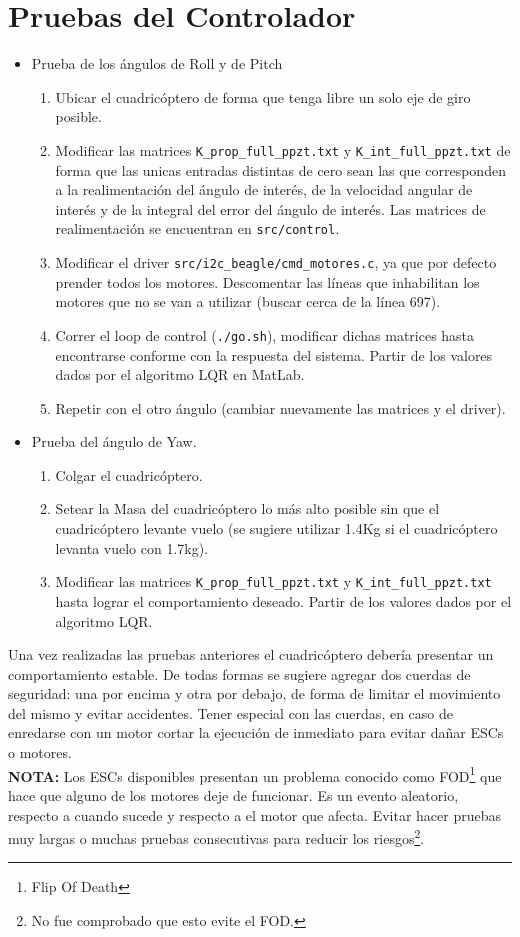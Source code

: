 \documentclass[main]{subfiles}
\begin{document}
\section{Pruebas del Controlador}
\begin{itemize}
\item Prueba de los \'angulos de Roll y de Pitch
	\begin{enumerate}
	\item Ubicar el cuadric\'optero de forma que tenga libre un solo eje de giro posible.
        \item Modificar las matrices \verb+K_prop_full_ppzt.txt+ y \verb+K_int_full_ppzt.txt+ de forma que las unicas entradas distintas de cero sean las que corresponden a la realimentaci\'on del \'angulo de inter\'es, de la velocidad angular de inter\'es y de la integral del error del \'angulo de inter\'es. Las matrices de realimentaci\'on se encuentran en \verb+src/control+.
        \item Modificar el driver \verb+src/i2c_beagle/cmd_motores.c+, ya que por defecto prender todos los motores. Descomentar las l\'ineas que inhabilitan los motores que no se van a utilizar (buscar cerca de la l\'inea 697).
	\item Correr el loop de control (\verb+./go.sh+), modificar dichas matrices hasta encontrarse conforme con la respuesta del sistema. Partir de los valores dados por el algoritmo LQR en MatLab.
	\item Repetir con el otro \'angulo (cambiar nuevamente las matrices y el driver).
	\end{enumerate}
\item Prueba del \'angulo de Yaw.
	\begin{enumerate}
	\item Colgar el cuadric\'optero.
	\item Setear la Masa del cuadric\'optero lo m\'as alto posible sin que el cuadric\'optero levante vuelo (se sugiere utilizar 1.4Kg si el cuadric\'optero levanta vuelo con 1.7kg).
	\item Modificar las matrices \verb+K_prop_full_ppzt.txt+ y \verb+K_int_full_ppzt.txt+ hasta lograr el comportamiento deseado. Partir de los valores dados por el algoritmo LQR.
	\end{enumerate}
\end{itemize}
Una vez realizadas las pruebas anteriores el cuadric\'optero deber\'ia presentar un comportamiento estable. De todas formas se sugiere agregar dos cuerdas de seguridad: una por encima y otra por debajo, de forma de limitar el movimiento del mismo y evitar accidentes. Tener especial con las cuerdas, en caso de enredarse con un motor cortar la ejecuci\'on de inmediato para evitar da\~nar ESCs o motores.\\

\textbf{NOTA:} Los ESCs disponibles presentan un problema conocido como FOD\footnote{Flip Of Death} que hace que alguno de los motores deje de funcionar. Es un evento aleatorio, respecto a cuando sucede y respecto a el motor que afecta. Evitar hacer pruebas muy largas o muchas pruebas consecutivas para reducir los riesgos\footnote{No fue comprobado que esto evite el FOD.}.
\end{document}

